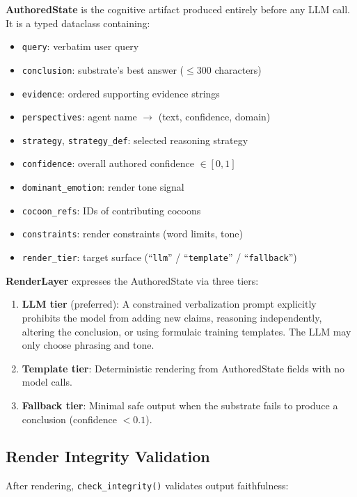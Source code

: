 \documentclass[11pt,a4paper]{article}
\begin{document}
\textbf{AuthoredState} is the cognitive artifact produced entirely before any
LLM call. It is a typed dataclass containing:

\begin{itemize}[nosep]
  \item \texttt{query}: verbatim user query
  \item \texttt{conclusion}: substrate's best answer ($\leq 300$ characters)
  \item \texttt{evidence}: ordered supporting evidence strings
  \item \texttt{perspectives}: agent name $\to$ (text, confidence, domain)
  \item \texttt{strategy}, \texttt{strategy\_def}: selected reasoning strategy
  \item \texttt{confidence}: overall authored confidence $\in [0,1]$
  \item \texttt{dominant\_emotion}: render tone signal
  \item \texttt{cocoon\_refs}: IDs of contributing cocoons
  \item \texttt{constraints}: render constraints (word limits, tone)
  \item \texttt{render\_tier}: target surface
    (``\texttt{llm}'' / ``\texttt{template}'' / ``\texttt{fallback}'')
\end{itemize}

\textbf{RenderLayer} expresses the AuthoredState via three tiers:

\begin{enumerate}[nosep]
  \item \textbf{LLM tier} (preferred): A constrained verbalization prompt
    explicitly prohibits the model from adding new claims, reasoning
    independently, altering the conclusion, or using formulaic training
    templates. The LLM may only choose phrasing and tone.
  \item \textbf{Template tier}: Deterministic rendering from AuthoredState
    fields with no model calls.
  \item \textbf{Fallback tier}: Minimal safe output when the substrate fails
    to produce a conclusion (confidence $< 0.1$).
\end{enumerate}

\subsection{Render Integrity Validation}

After rendering, \texttt{check\_integrity()} validates output faithfulness:
\end{document}
